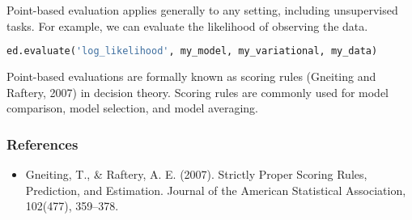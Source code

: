 Point-based evaluation applies generally to any setting, including
unsupervised tasks. For example, we can evaluate the likelihood of
observing the data.
\begin{lstlisting}[language=Python]
ed.evaluate('log_likelihood', my_model, my_variational, my_data)
\end{lstlisting}

Point-based evaluations are formally known as scoring rules (Gneiting
and Raftery, 2007) in decision theory. Scoring rules are commonly
used for model comparison, model selection, and model averaging.

\subsubsection{References}\label{references}

\begin{itemize}
\item
  Gneiting, T., & Raftery, A. E. (2007). Strictly Proper Scoring
  Rules, Prediction, and Estimation. Journal of the American
  Statistical Association, 102(477), 359–378.
\end{itemize}
